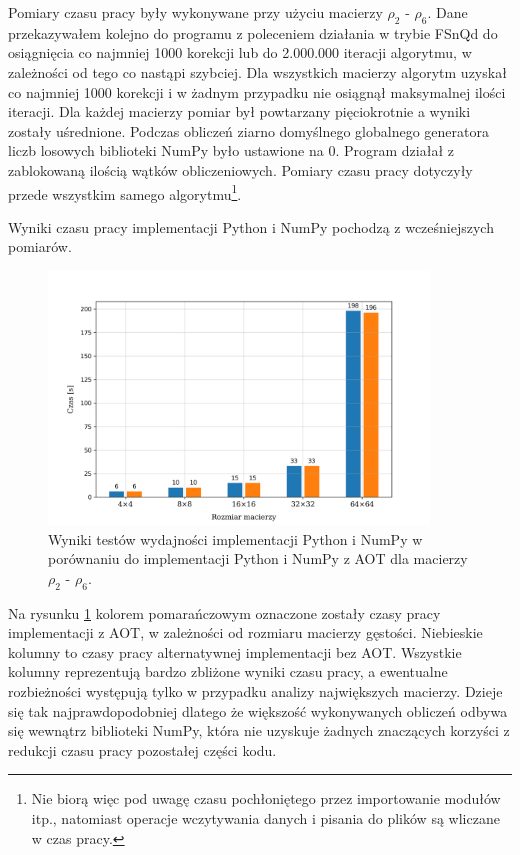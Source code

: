 \documentclass[10pt, a4paper]{article}
\begin{document}
\begin{sloppypar}
    Pomiary czasu pracy były wykonywane przy użyciu macierzy $\rho_{2}$ - $\rho_{6}$.
    Dane przekazywałem kolejno do programu z poleceniem działania w trybie FSnQd do
    osiągnięcia co najmniej 1000 korekcji lub do 2.000.000 iteracji algorytmu, w
    zależności od tego co nastąpi szybciej. Dla wszystkich macierzy algorytm uzyskał co najmniej
    1000 korekcji i w żadnym przypadku nie osiągnął maksymalnej ilości iteracji. Dla
    każdej macierzy pomiar był powtarzany pięciokrotnie a wyniki zostały uśrednione. Podczas
    obliczeń ziarno domyślnego globalnego generatora liczb losowych biblioteki NumPy było
    ustawione na 0. Program działał z zablokowaną ilością wątków obliczeniowych. Pomiary
    czasu pracy dotyczyły przede wszystkim samego algorytmu\footnote{Nie biorą więc pod uwagę
    czasu pochłoniętego przez importowanie modułów itp., natomiast operacje wczytywania danych
    i pisania do plików są wliczane w czas pracy.}.

    Wyniki czasu pracy implementacji Python i NumPy pochodzą z wcześniejszych pomiarów.

    \FloatBarrier
    \begin{figure}[ht]
      \centering
      \includegraphics[width=0.9\textwidth]{"resources/benchmark_3/plot.png"}
      \caption{Wyniki testów wydajności implementacji Python i NumPy w porównaniu do implementacji Python i NumPy z AOT dla macierzy $\rho
      _{2}$ - $\rho_{6}$.}
      \label{second-perf}
    \end{figure}
    \FloatBarrier

    Na rysunku \ref{second-perf} kolorem pomarańczowym oznaczone zostały czasy pracy
    implementacji z AOT, w zależności od rozmiaru macierzy gęstości. Niebieskie kolumny
    to czasy pracy alternatywnej implementacji bez AOT. Wszystkie kolumny reprezentują bardzo
    zbliżone wyniki czasu pracy, a ewentualne rozbieżności występują tylko w przypadku
    analizy największych macierzy. Dzieje się tak najprawdopodobniej dlatego że większość
    wykonywanych obliczeń odbywa się wewnątrz biblioteki NumPy, która nie uzyskuje
    żadnych znaczących korzyści z redukcji czasu pracy pozostałej części kodu.


\end{sloppypar}
\end{document}
